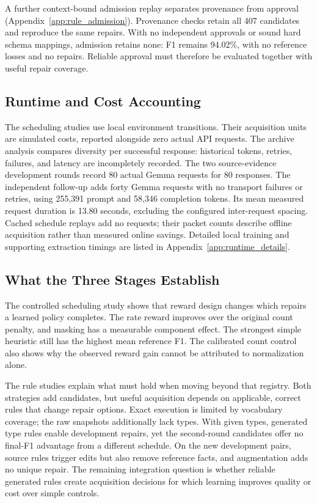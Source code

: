 A further context-bound admission replay separates provenance from approval
(Appendix~\ref{app:rule_admission}). Provenance checks retain all 407 candidates
and reproduce the same repairs. With no independent approvals or sound hard
schema mappings, admission retains none: F1 remains 94.02\%, with no reference
losses and no repairs. Reliable approval must therefore be evaluated together
with useful repair coverage.

\subsection{Runtime and Cost Accounting}
\label{subsec:runtime_cost}
The scheduling studies use local environment transitions. Their acquisition
units are simulated costs, reported alongside zero actual API requests.
The archive analysis compares diversity per successful response: historical
tokens, retries, failures, and latency are incompletely recorded. The two
source-evidence development rounds record 80 actual Gemma requests for
80 responses. The independent follow-up adds forty Gemma requests with no
transport failures or retries, using 255,391 prompt and 58,346 completion
tokens. Its mean measured request duration is 13.80 seconds, excluding the
configured inter-request spacing. Cached schedule replays add no requests;
their packet counts describe offline acquisition rather than measured online
savings. Detailed local
training and supporting extraction timings are listed in
Appendix~\ref{app:runtime_details}.

\subsection{What the Three Stages Establish}
The controlled scheduling study shows that reward design changes which
repairs a learned policy completes. The rate reward improves over the
original count penalty, and masking has a measurable component effect.
The strongest simple heuristic still has the highest mean reference F1.
The calibrated count control also shows why the observed reward gain cannot
be attributed to normalization alone.

The rule studies explain what must hold when moving beyond that registry.
Both strategies add candidates, but useful acquisition depends on applicable,
correct rules that change repair options. Exact execution is limited by
vocabulary coverage; the raw snapshots additionally lack types. With given types, generated type rules enable development repairs, yet the second-round
candidates offer no final-F1 advantage from a different schedule. On the new
development pairs, source rules trigger edits but also remove reference facts,
and augmentation adds no unique repair. The remaining
integration question is whether reliable generated rules create acquisition
decisions for which learning improves quality or cost over simple controls.

